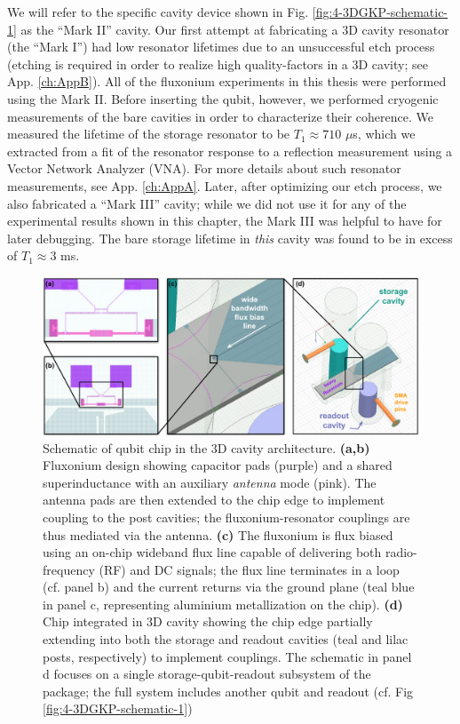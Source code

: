 We will refer to the specific cavity device shown in Fig. \ref{fig:4-3DGKP-schematic-1} as the ``Mark II'' cavity. Our first attempt at fabricating a 3D cavity resonator (the ``Mark I'') had low resonator lifetimes due to an unsuccessful etch process (etching is required in order to realize high quality-factors in a 3D cavity; see App. \ref{ch:AppB}). All of the fluxonium experiments in this thesis were performed using the Mark II. Before inserting the qubit, however, we performed cryogenic measurements of the bare cavities in order to characterize their coherence. We measured the lifetime of the storage resonator to be $T_1 \approx 710$ $\mu$s, which we extracted from a fit of the resonator response to a reflection measurement using a Vector Network Analyzer (VNA). For more details about such resonator measurements, see App. \ref{ch:AppA}. Later, after optimizing our etch process, we also fabricated a ``Mark III'' cavity; while we did not use it for any of the experimental results shown in this chapter, the Mark III was helpful to have for later debugging. The bare storage lifetime in \textit{this} cavity was found to be in excess of $T_1 \approx 3$ ms. 


\begin{figure}[h]
    \centering
    \includegraphics[width=\linewidth]{Figures/4/3DGKP-Schematic-2.pdf}
    \caption{Schematic of qubit chip in the 3D cavity architecture. \textbf{(a,b)} Fluxonium design showing capacitor pads (purple) and a shared superinductance with an auxiliary \textit{antenna} mode (pink). The antenna pads are then extended to the chip edge to implement coupling to the post cavities; the fluxonium-resonator couplings are thus mediated via the antenna. \textbf{(c)} The fluxonium is flux biased using an on-chip wideband flux line capable of delivering both radio-frequency (RF) and DC signals; the flux line terminates in a loop (cf. panel b) and the current returns via the ground plane (teal blue in panel c, representing aluminium metallization on the chip). \textbf{(d)} Chip integrated in 3D cavity showing the chip edge partially extending into both the storage and readout cavities (teal and lilac posts, respectively) to implement couplings. The schematic in panel d focuses on a single storage-qubit-readout subsystem of the package; the full system includes another qubit and readout (cf. Fig \ref{fig:4-3DGKP-schematic-1})}
    \label{fig:4-3DGKP-schematic-2}
\end{figure}


